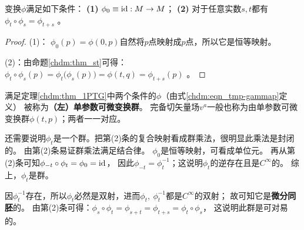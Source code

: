 \begin{theorem}\label{chdm:thm_1PTG}    
    变换$\phi$满足如下条件：    
    {\bfseries (1)} $\phi_0\equiv {\rm id} : M\to M$；    
    {\bfseries (2)} 对于任意实数$s,t$都有$\phi_t\circ \phi_s = \phi_{t+s}$ 。    
\end{theorem}
\begin{proof}
    (1)： $\phi_0(p)=\phi(0,p)$自然将$p$点映射成$p$点，所以它是恒等映射。
    
    (2)：由命题\ref{chdm:thm_st}可得：
    $\phi_t\circ \phi_s(p)=\phi_t\bigl(\phi_s(p)\bigr) =\phi(t,q)= \phi_{t+s}(p)$ 。
\end{proof}    
满足定理\ref{chdm:thm_1PTG}中两个条件的$\phi$（由式\eqref{chdm:eqn_tmp-gammap}定义）
被称为\textbf{（左）单参数可微变换群}。
完备切矢量场$v^a$一般也称为由单参数可微变换群$\phi(t,p)$；两者一一对应。

还需要说明$\phi_t$是一个群。把第(2)条的复合映射看成群乘法，很明显此乘法是封闭的。
由第(2)条易证群乘法满足结合律。
$\phi_0$是恒等映射，可看成单位元。
再从第(2)条可知$\phi_{-t}\circ \phi_t=\phi_0={\rm id}$，
因此$\phi_{-t} = \phi_t^{-1}$；这说明$\phi_t$的逆存在且是$C^\infty$的。
综上，$\phi_t$是群。




因$\phi_t^{-1}$存在，所以$\phi_t$必然是双射，进而$\phi_t, \ \phi_t^{-1}$都是$C^\infty$的双射；
故可知它是\textbf{微分同胚}的。
由第(2)条可得：$\phi_s\circ \phi_t = \phi_{s+t}= \phi_{t+s}=\phi_t\circ \phi_s$，
这说明此群是可对易的。




